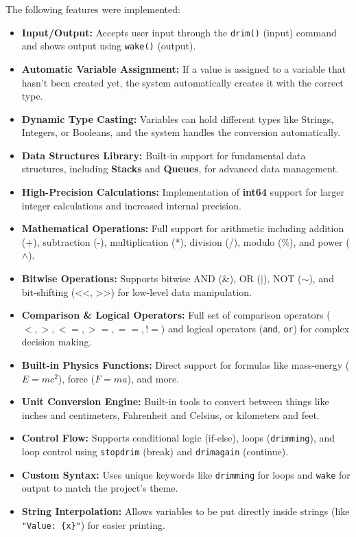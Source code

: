 \documentclass[12pt, a4paper]{article}
\begin{document}
The following features were implemented:
\begin{itemize}
    \item \textbf{Input/Output:} Accepts user input through the \texttt{drim()} (input) command and shows output using \texttt{wake()} (output).
    \item \textbf{Automatic Variable Assignment:} If a value is assigned to a variable that hasn't been created yet, the system automatically creates it with the correct type.
    \item \textbf{Dynamic Type Casting:} Variables can hold different types like Strings, Integers, or Booleans, and the system handles the conversion automatically.
    \item \textbf{Data Structures Library:} Built-in support for fundamental data structures, including \textbf{Stacks} and \textbf{Queues}, for advanced data management.
    \item \textbf{High-Precision Calculations:} Implementation of \textbf{int64} support for larger integer calculations and increased internal precision.
    \item \textbf{Mathematical Operations:} Full support for arithmetic including addition (+), subtraction (-), multiplication (*), division (/), modulo (\%), and power ($\wedge$).
    \item \textbf{Bitwise Operations:} Supports bitwise AND (\&), OR ($|$), NOT ($\sim$), and bit-shifting (<<, >>) for low-level data manipulation.
    \item \textbf{Comparison \& Logical Operators:} Full set of comparison operators ($<, >, <=, >=, ==, !=$) and logical operators (\texttt{and}, \texttt{or}) for complex decision making.
    \item \textbf{Built-in Physics Functions:} Direct support for formulas like mass-energy ($E=mc^2$), force ($F=ma$), and more.
    \item \textbf{Unit Conversion Engine:} Built-in tools to convert between things like inches and centimeters, Fahrenheit and Celsius, or kilometers and feet.
    \item \textbf{Control Flow:} Supports conditional logic (if-else), loops (\texttt{drimming}), and loop control using \texttt{stopdrim} (break) and \texttt{drimagain} (continue).
    \item \textbf{Custom Syntax:} Uses unique keywords like \texttt{drimming} for loops and \texttt{wake} for output to match the project's theme.
    \item \textbf{String Interpolation:} Allows variables to be put directly inside strings (like \texttt{"Value: \{x\}"}) for easier printing.

\end{itemize}
\end{document}
